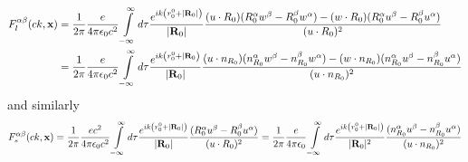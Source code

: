 \begin{align}
  F_l^{\alpha\beta}(ck,{\bf x}) & =\frac1{2\pi}\frac{e}{4\pi\epsilon_0c^2}\int\limits_{-\infty}^{\infty}d\tau \frac{e^{ik\left(r_0^0+|{\bf R}_0|\right)}}{|{\bf R}_0|}\frac{(u\cdot R_0)(R_0^{\alpha}w^{\beta}-R_0^{\beta}w^{\alpha})-(w\cdot R_0)(R_0^{\alpha}u^{\beta}-R_0^{\beta}u^{\alpha})}
  {(u\cdot R_0)^2}\nonumber                                                                                                                                                                                                                                                \\
  & =\frac1{2\pi}\frac{e}{4\pi\epsilon_0c^2}\int\limits_{-\infty}^{\infty}d\tau \frac{e^{ik\left(r_0^0+|{\bf R}_0\right)}}{|{\bf R}_0|}\frac{(u\cdot n_{R_0})(n_{R_0}^{\alpha}w^{\beta}-n_{R_0}^{\beta}w^{\alpha})-(w\cdot n_{R_0})(n_{R_0}^{\alpha}u^{\beta}-n_{R_0}^{\beta}u^{\alpha})}
  {(u\cdot n_{R_0})^2}
\end{align}
and similarly
\begin{align}
  F_s^{\alpha\beta}(ck,{\bf x})=\frac1{2\pi}\frac{e c^2}{4\pi\epsilon_0c^2}\int\limits_{-\infty}^{\infty}d\tau \frac{e^{ik\left(r_0^0+|{\bf R}_0|\right)}}{|{\bf R}_0|}\frac{(R_0^{\alpha}u^{\beta}-R_0^{\beta}u^{\alpha})}
  {(u\cdot R_0)^2}=\frac1{2\pi}\frac{e}{4\pi\epsilon_0}\int\limits_{-\infty}^{\infty}d\tau \frac{e^{ik\left(r_0^0+|{\bf R}_0|\right)}}{|{\bf R}_0|^2}\frac{(n_{R_0}^{\alpha}u^{\beta}-n_{R_0}^{\beta}u^{\alpha})}
  {(u\cdot n_{R_0})^2}
\end{align}

